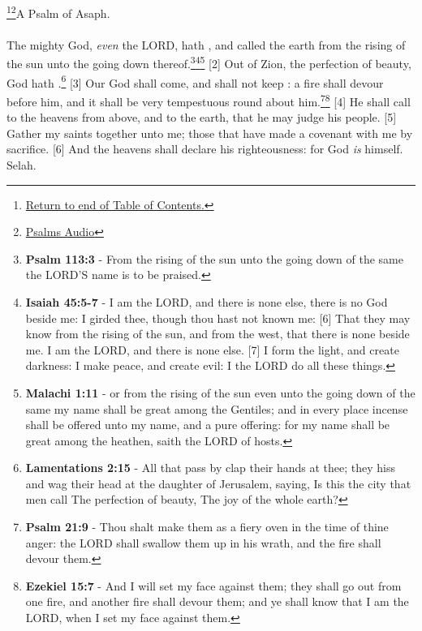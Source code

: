 \footnote{\textcolor[cmyk]{0.99998,1,0,0}{\hyperlink{TOC}{Return to end of Table of Contents.}}}\footnote{\href{https://www.audioverse.org/english/audiobibles/books/ENGKJV/O/Ps/1}{\textcolor[cmyk]{0.99998,1,0,0}{Psalms Audio}}}\textcolor[cmyk]{0.99998,1,0,0}{A Psalm of Asaph.}\\
\\
\textcolor[cmyk]{0.99998,1,0,0}{The mighty God, \emph{even} the LORD, hath , and called the earth from the rising of the sun unto the going down thereof.}\footnote{\textbf{Psalm 113:3} - From the rising of the sun unto the going down of the same the LORD’S name is to be praised.}\footnote{\textbf{Isaiah 45:5-7} -  I am the LORD, and there is none else, there is no God beside me: I girded thee, though thou hast not known me: [6] That they may know from the rising of the sun, and from the west, that there is none beside me. I am the LORD, and there is none else. [7] I form the light, and create darkness: I make peace, and create evil: I the LORD do all these things.}\footnote{\textbf{Malachi 1:11} - or from the rising of the sun even unto the going down of the same my name shall be great among the Gentiles; and in every place incense shall be offered unto my name, and a pure offering: for my name shall be great among the heathen, saith the LORD of hosts.}
[2] \textcolor[cmyk]{0.99998,1,0,0}{Out of Zion, the perfection of beauty, God hath .}\footnote{\textbf{Lamentations 2:15} - All that pass by clap their hands at thee; they hiss and wag their head at the daughter of Jerusalem, saying, Is this the city that men call The perfection of beauty, The joy of the whole earth? }
[3] \textcolor[cmyk]{0.99998,1,0,0}{Our God shall come, and shall not keep : a fire shall devour before him, and it shall be very tempestuous round about him.}\footnote{\textbf{Psalm 21:9} - Thou shalt make them as a fiery oven in the time of thine anger: the LORD shall swallow them up in his wrath, and the fire shall devour them.}\footnote{\textbf{Ezekiel 15:7} - And I will set my face against them; they shall go out from one fire, and another fire shall devour them; and ye shall know that I am the LORD, when I set my face against them.}
[4] \textcolor[cmyk]{0.99998,1,0,0}{He shall call to the heavens from above, and to the earth, that he may judge his people.}
[5] \textcolor[cmyk]{0.99998,1,0,0}{Gather my saints together unto me; those that have made a covenant with me by sacrifice.}
[6] \textcolor[cmyk]{0.99998,1,0,0}{And the heavens shall declare his righteousness: for God \emph{is}  himself. Selah.}

